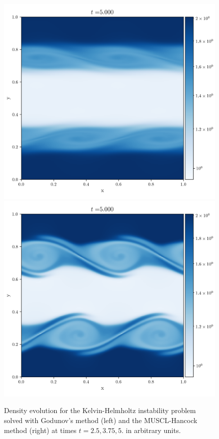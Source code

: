 \begin{figure}
\\
\includegraphics[width=.5\linewidth]{figures/FV/godunov_euler/kelvin-helmholtz-1000.png}%
\includegraphics[width=.5\linewidth]{figures/FV/MUSCL-Hancock/kelvin-helmholtz-1000.png}%
\caption[Kelvin-Helmholtz Instability with Godunov's scheme and MUSCL-Hancock 2]{
Density evolution for the Kelvin-Helmholtz instability problem solved with Godunov's method (left)
and the MUSCL-Hancock method (right) at times $t = 2.5, 3.75, 5.$ in arbitrary units.
}
\label{fig:kelvin-helmholtz-2}
\end{figure}













